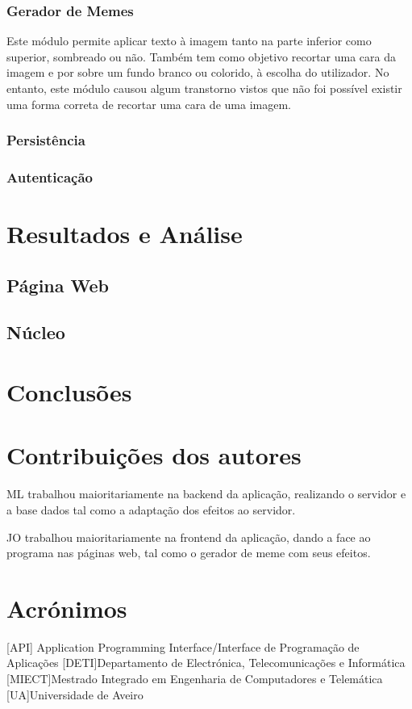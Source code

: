 \documentclass{report}
\begin{document}
\subsection{Gerador de Memes}

Este módulo permite aplicar texto à imagem tanto na parte inferior como superior, sombreado ou não. Também tem como objetivo recortar uma cara da imagem e por sobre um fundo branco ou colorido, à escolha do utilizador. No entanto, este módulo causou algum transtorno vistos que não foi possível existir uma forma correta de recortar uma cara de uma imagem.

\subsection{Persistência}

\subsection{Autenticação}

\chapter{Resultados e Análise}
\label{chap.res}

\section{Página Web}

\section{Núcleo}


\chapter{Conclusões}
\label{chap.conc}

\chapter*{Contribuições dos autores}

ML trabalhou maioritariamente na backend da aplicação, realizando o servidor e a base dados tal como a adaptação dos efeitos ao servidor.

JO trabalhou maioritariamente na frontend da aplicação, dando a face ao programa nas páginas web, tal como o gerador de meme com seus efeitos.

\chapter*{Acrónimos}
\begin{acronym}
 [API] {Application Programming Interface/Interface de Programação de Aplicações}
 [DETI]{Departamento de Electrónica, Telecomunicações e Informática}
 [MIECT]{Mestrado Integrado em Engenharia de Computadores e Telemática}
 [UA]{Universidade de Aveiro}
\end{acronym}


%
\end{document}
